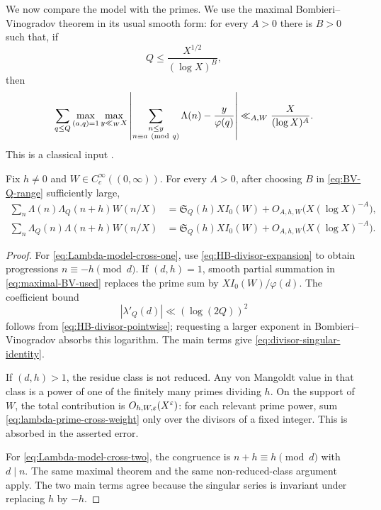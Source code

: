 We now compare the model with the primes.  We use the maximal
Bombieri--Vinogradov theorem in its usual smooth form: for every $A>0$
there is $B>0$ such that, if
\begin{equation}
 Q\leq \frac{X^{1/2}}{(\log X)^B},
 \label{eq:BV-Q-range}
\end{equation}
then
\begin{equation}
 \sum_{q\leq Q}\max_{(a,q)=1}\max_{y\ll_W X}
 \left|
 \sum_{\substack{n\leq y\\n\equiv a\ ({\rm mod}\ q)}}\Lambda(n)
 -\frac y{\varphi(q)}
 \right|
 \ll_{A,W}\frac{X}{(\log X)^A}.
 \label{eq:maximal-BV-used}
\end{equation}
This is a classical input \citep{IwaniecKowalski2004,MontgomeryVaughan2007}.

\begin{theorem}
\label{thm:prime-model-cross-correlations}
Fix $h\ne0$ and $W\in C_c^\infty((0,\infty))$.  For every $A>0$, after
choosing $B$ in \eqref{eq:BV-Q-range} sufficiently large,
\begin{align}
 \sum_n\Lambda(n)\Lambda_Q(n+h)W(n/X)
 &=\mathfrak S_Q(h)XI_0(W)
 +O_{A,h,W}\bigl(X(\log X)^{-A}\bigr),
 \label{eq:Lambda-model-cross-one}\\
 \sum_n\Lambda_Q(n)\Lambda(n+h)W(n/X)
 &=\mathfrak S_Q(h)XI_0(W)
 +O_{A,h,W}\bigl(X(\log X)^{-A}\bigr).
 \label{eq:Lambda-model-cross-two}
\end{align}
\end{theorem}

\begin{proof}
For \eqref{eq:Lambda-model-cross-one}, use
\eqref{eq:HB-divisor-expansion} to obtain progressions
$n\equiv-h\pmod d$.  If $(d,h)=1$, smooth partial summation in
\eqref{eq:maximal-BV-used} replaces the prime sum by
$XI_0(W)/\varphi(d)$.  The coefficient bound
\begin{equation}
 |\lambda'_Q(d)|\ll (\log(2Q))^2
 \label{eq:lambda-prime-cross-weight}
\end{equation}
follows from \eqref{eq:HB-divisor-pointwise}; requesting a larger exponent
in Bombieri--Vinogradov absorbs this logarithm.  The main terms give
\eqref{eq:divisor-singular-identity}.

If $(d,h)>1$, the residue class is not reduced.  Any von Mangoldt value in
that class is a power of one of the finitely many primes dividing $h$.
On the support of $W$, the total contribution is
$O_{h,W,\varepsilon}(X^\varepsilon)$: for each relevant prime power, sum
\eqref{eq:lambda-prime-cross-weight} only over the divisors of a fixed
integer.  This is absorbed in the asserted error.

For \eqref{eq:Lambda-model-cross-two}, the congruence is
$n+h\equiv h\pmod d$ with $d\mid n$.  The same maximal theorem and the
same non-reduced-class argument apply.  The two main terms agree because
the singular series is invariant under replacing $h$ by $-h$.
\end{proof}


